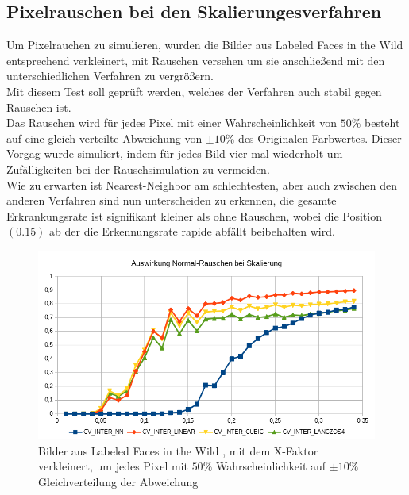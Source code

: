 \subsection{Pixelrauschen bei den Skalierungesverfahren}
Um Pixelrauchen zu simulieren, wurden die Bilder aus Labeled Faces in the Wild \cite{database_Face} entsprechend verkleinert, mit Rauschen versehen um sie anschließend mit den unterschiedlichen Verfahren zu vergrößern.\\
Mit diesem Test soll geprüft werden, welches der Verfahren auch stabil gegen Rauschen ist.\\
Das Rauschen wird für jedes Pixel mit einer Wahrscheinlichkeit von $50\%$ besteht auf eine gleich verteilte Abweichung von $\pm 10\%$ des Originalen Farbwertes. Dieser Vorgag wurde simuliert, indem für jedes Bild vier mal wiederholt um Zufälligkeiten bei der Rauschsimulation zu vermeiden.\\
Wie zu erwarten ist Nearest-Neighbor am schlechtesten, aber auch zwischen den anderen Verfahren sind nun unterscheiden zu erkennen, die gesamte Erkrankungsrate ist signifikant kleiner als ohne Rauschen, wobei die Position $(0.15)$ ab der die Erkennungsrate rapide abfällt beibehalten wird.
\begin{figure}
	\centering
	\includegraphics[width=0.7\linewidth]{img/Hochskalliern_Nois}
	\caption{Bilder aus Labeled Faces in the Wild \cite{database_Face}, mit dem X-Faktor verkleinert, um jedes Pixel mit $50\%$ Wahrscheinlichkeit auf $\pm 10\%$ Gleichverteilung der Abweichung}
	\label{img_hochskalliern_nois}
\end{figure}
